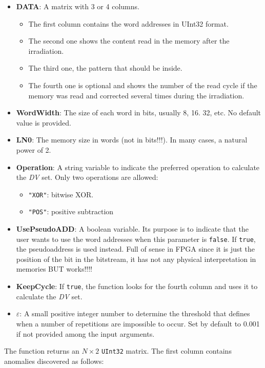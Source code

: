 \begin{itemize}
\begin{itemize}
 		\item   \textbf{DATA}: A matrix with 3 or 4 columns. 
 		\begin{itemize}
 			\item The first column contains the word addresses in UInt32 format.
 			\item The second one shows the content read in the memory after the irradiation.
 			\item The third one, the pattern that should be inside.
 			\item  The fourth one is optional and shows the number of the read cycle if the   memory was read and corrected several times during the irradiation.
 		\end{itemize}
 		\item   \textbf{WordWidth}: The size of each word in bits, usually 8, 16. 32, etc. No default value is provided.
 		\item   \textbf{LN0}: The memory size in words (not in bits!!!). In many cases, a natural power of 2.
 		\item   \textbf{Operation}: A string variable to indicate the preferred operation to calculate
 		the \textit{DV} set. Only two operations are allowed: 
 		\begin{itemize}
 			\item \texttt{"XOR"}: bitwise XOR.
 			\item\texttt{"POS"}: positive subtraction
 		\end{itemize}
 		\item  \textbf{UsePseudoADD}: A boolean variable. Its purpose is to indicate that the user wants to use the word addresses when this parameter is \texttt{false}. If \texttt{true}, the pseudoaddress  is used instead. Full of sense in FPGA since it is just the position  of the bit in the bitstream, it has not any physical interpretation in memories BUT works!!!!
 		\item   \textbf{KeepCycle}: If \texttt{true}, the function looks for the fourth column and uses it to calculate the \textit{DV} set.
 		\item   \textbf{\(\varepsilon\)}: A small positive integer number to determine the threshold that defines when a number of repetitions are impossible to occur. Set by default to 0.001 if not provided among the input arguments.
 		
 	\end{itemize}
 	
 	The function returns an \(N\times 2\) \texttt{UInt32} matrix. The first column contains anomalies discovered as follows:
 	

\end{itemize}
